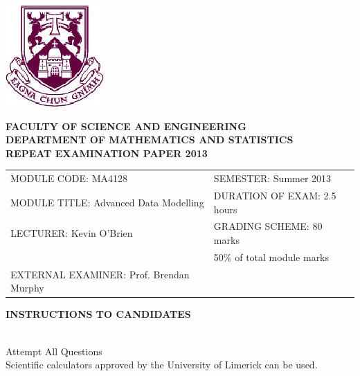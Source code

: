 \documentclass{article}
\begin{document}
\begin{center}
       \includegraphics[scale=0.55]{shieldtransparent2}
\end{center}

\begin{center}
\vspace{1cm}
\large \bf {FACULTY OF SCIENCE AND ENGINEERING} \\[0.5cm]
\normalsize DEPARTMENT OF MATHEMATICS AND STATISTICS \\[1.25cm]
\large \bf {REPEAT EXAMINATION PAPER 2013} \\[1.5cm]
\end{center}

\begin{tabular}{ll}
MODULE CODE: MA4128 & SEMESTER: Summer 2013 \\[1cm]
MODULE TITLE: Advanced Data Modelling & DURATION OF EXAM: 2.5 hours \\[1cm]
LECTURER: Kevin O'Brien & GRADING SCHEME: 80 marks \\
& \phantom{GRADING SCHEME:} \footnotesize {50\% of total module marks} \\[0.7cm]

EXTERNAL EXAMINER: Prof. Brendan Murphy &  \\[0.8cm]
\end{tabular}
\begin{center}
{\bf INSTRUCTIONS TO CANDIDATES}
\end{center}

{\noindent \\ Attempt All Questions
\\ Scientific calculators approved by the University of Limerick can be used. 
}
\end{document}
